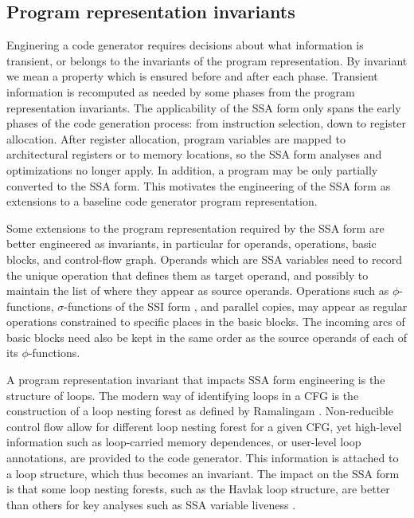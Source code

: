 \subsection{Program representation invariants}


Enginering a code generator requires decisions about what information is
transient, or belongs to the invariants of the program representation.  By
invariant we mean a property which is ensured before and after each phase.
Transient information is recomputed as needed by some phases from the program
representation invariants.  The applicability of the SSA form only spans the
early phases of the code generation process: from instruction selection, down to
register allocation.  After register allocation, program variables are mapped to
architectural registers or to memory locations, so the SSA form analyses and
optimizations no longer apply. In addition, a program may be only partially
converted to the SSA form. This motivates the engineering of the SSA form
as extensions to a baseline code generator program representation.

Some extensions to the program representation required by the SSA form are
better engineered as invariants, in particular for operands, operations, basic
blocks, and control-flow graph.  Operands which are SSA variables need to record
the unique operation that defines them as target operand, and possibly to
maintain the list of where they appear as source operands. Operations such as
$\phi$-functions, $\sigma$-functions of the SSI form \cite{BoissinotBDR12}, and
parallel copies, may appear as regular operations constrained to specific places
in the basic blocks. The incoming arcs of basic blocks need also be kept in the
same order as the source operands of each of its $\phi$-functions.

A program representation invariant that impacts SSA form engineering is the
structure of loops. The modern way of identifying loops in a CFG is the
construction of a loop nesting forest as defined by Ramalingam
\cite{ramalingam:loopforest}. Non-reducible control flow allow for different
loop nesting forest for a given CFG, yet high-level information such as
loop-carried memory dependences, or user-level loop annotations, are provided to
the code generator. This information is attached to a loop structure, which thus
becomes an invariant. The impact on the SSA form is that some loop nesting
forests, such as the Havlak \cite{havlak:loop} loop structure, are better than
others for key analyses such as SSA variable liveness
\cite{Boissinot:2011:APLAS}.

